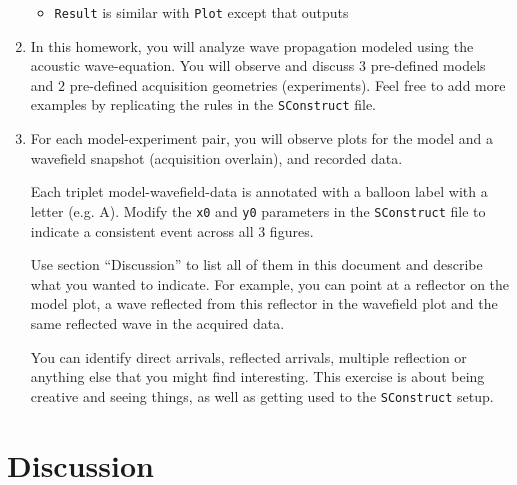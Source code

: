 \begin{enumerate}
\begin{itemize}
\item \texttt{Result} is similar with \texttt{Plot} except
that outputs

\end{itemize}

\item In this homework, you will analyze wave propagation modeled
using the acoustic wave-equation. 
You will observe and discuss $3$ pre-defined models and 
$2$ pre-defined acquisition geometries (experiments).
Feel free to add more examples by replicating the rules in the
\texttt{SConstruct} file.

\item 
For each model-experiment pair, you will observe
plots for the model and a wavefield snapshot (acquisition overlain),
and recorded data.

Each triplet model-wavefield-data is annotated with a balloon
label with a letter (e.g. A). Modify the \texttt{x0} and \texttt{y0}
parameters in the \texttt{SConstruct} file to indicate a consistent 
event across all 3 figures.

Use section ``Discussion''
to list all of them in this document and describe what you 
wanted to indicate. For example, you can point at 
a reflector on the model plot,
a wave reflected from this reflector in the wavefield plot and
the same reflected wave in the acquired data.

You can identify direct arrivals, reflected arrivals, 
multiple reflection or anything else that you might find 
interesting.
This exercise is about being creative and seeing things,
as well as getting used to the  \texttt{SConstruct} setup.

\end{enumerate}



\section{Discussion}

